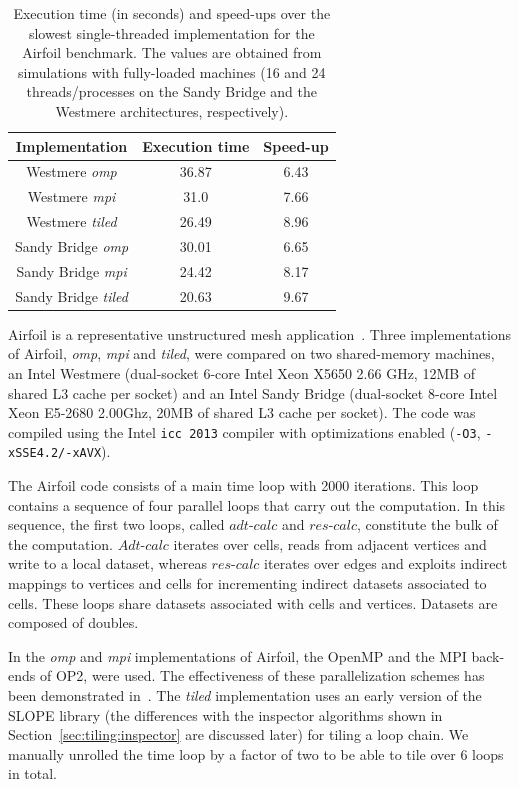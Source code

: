 \begin{table}[t]
\centering
\begin{tabulary}{1.0\columnwidth}{c | c | c}
\hline
Implementation & Execution time & Speed-up \\
\hline
Westmere {\em omp} & 36.87 & 6.43\\
Westmere {\em mpi} & 31.0 & 7.66 \\
Westmere {\em tiled} & 26.49 & 8.96 \\
\hline \hline
Sandy Bridge {\em omp} & 30.01 & 6.65 \\
Sandy Bridge {\em mpi} & 24.42 & 8.17 \\
Sandy Bridge {\em tiled} & 20.63 & 9.67 \\
\hline
\end{tabulary}
\caption{Execution time (in seconds) and speed-ups over the slowest single-threaded implementation for the Airfoil benchmark. The values are obtained from simulations with fully-loaded machines (16 and 24 threads/processes on the Sandy Bridge and the Westmere architectures, respectively).}
\label{table:st-airfoil}
\end{table}

Airfoil is a representative unstructured mesh application~\cite{AIRFOIL}. Three implementations of Airfoil, {\em omp}, {\em mpi} and {\em tiled}, were compared on two shared-memory machines, an Intel Westmere (dual-socket 6-core Intel Xeon X5650 2.66 GHz, 12MB of shared L3 cache per socket) and an Intel Sandy Bridge (dual-socket 8-core Intel Xeon E5-2680 2.00Ghz, 20MB of shared L3 cache per socket). The code was compiled using the Intel \texttt{icc 2013} compiler with optimizations enabled (\texttt{-O3}, \texttt{-xSSE4.2/-xAVX}).

The Airfoil code consists of a main time loop with 2000 iterations. This loop contains a sequence of four parallel loops that carry out the computation. In this sequence, the first two loops, called $adt$-$calc$ and $res$-$calc$, constitute the bulk of the computation. $Adt$-$calc$ iterates over cells, reads from adjacent vertices and write to a local dataset, whereas $res$-$calc$ iterates over edges and exploits indirect mappings to vertices and cells for incrementing indirect datasets associated to cells. These loops share datasets associated with cells and vertices. Datasets are composed of doubles.

In the {\em omp} and {\em mpi} implementations of Airfoil, the OpenMP and the MPI back-ends of OP2, were used. The effectiveness of these parallelization schemes has been demonstrated in~\cite{op2-main}. The {\em tiled} implementation uses an early version of the SLOPE library (the differences with the inspector algorithms shown in Section~\ref{sec:tiling:inspector} are discussed later) for tiling a loop chain. We manually unrolled the time loop by a factor of two to be able to tile over 6 loops in total. 

